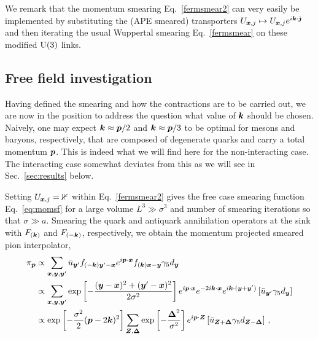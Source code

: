 We remark that the momentum smearing Eq.~\eqref{fermsmear2} can very
easily be implemented by substituting the (APE smeared) transporters
$U_{\boldsymbol{x},j}\mapsto U_{\boldsymbol{x},j}e^{i\boldsymbol{k}\cdot\hat{\boldsymbol{\jmath}}}$
and then iterating the usual Wuppertal smearing
Eq.~\eqref{fermsmear} on these modified
$\textmd{U}(3)$ links.

\subsection{Free field investigation}
\label{freefield}
Having defined the smearing and how the contractions are to be
carried out, we are now in the position to address the question
what value of $\boldsymbol{k}$
should be chosen. Naively, one may expect $\boldsymbol{k}\approx \boldsymbol{p}/2$
and $\boldsymbol{k}\approx\boldsymbol{p}/3$ to be optimal for mesons and baryons,
respectively, that are composed of degenerate quarks and carry
a total momentum
$\boldsymbol{p}$. This is indeed what we will find here for
the non-interacting case.
The interacting case somewhat deviates from this as we will
see in Sec.~\ref{sec:results} below.

Setting $U_{\boldsymbol{x},j}=\mathbb{1}$ within Eq.~\eqref{fermsmear2}
gives the free case smearing function Eq.~\eqref{eq:momsf}
for a large volume $L^3\gg\sigma^3$ and number of smearing iterations
so that $\sigma\gg a$.
Smearing the quark and antiquark annihilation operators
at the sink with $F_{(\boldsymbol{k})}$
and $F_{(-\boldsymbol{k})}$, respectively, we obtain
the momentum projected smeared pion interpolator,
\begin{align}
\pi_{\boldsymbol{p}}&\propto
\sum_{\boldsymbol{x}, \boldsymbol{y},\boldsymbol{y}^{\prime}}
\bar{u}_{\boldsymbol{y}'}f_{(-\boldsymbol{k})\boldsymbol{y}'-\boldsymbol{x}} e^{i\boldsymbol{p}\cdot\boldsymbol{x}}
f_{(\boldsymbol{k})\boldsymbol{x}-\boldsymbol{y}}\gamma_5d_{\boldsymbol{y}}\nonumber\\
&\propto\sum_{\boldsymbol{x}, \boldsymbol{y},\boldsymbol{y}^{\prime}}\exp\left[-\frac{(\boldsymbol{y}-\boldsymbol{x})^2+(\boldsymbol{y}'-\boldsymbol{x})^2}{2\sigma^2}\right]
 e^{i\boldsymbol{p}\cdot\boldsymbol{x}}e^{-2i\boldsymbol{k}\cdot\boldsymbol{x}} e^{i\boldsymbol{k}\cdot(\boldsymbol{y}+\boldsymbol{y}^{\prime})} \left[\bar{u}_{\boldsymbol{y}^{\prime}} \gamma_5 d_{\boldsymbol{y}}\right]\label{eq:freec}\\\nonumber
&\propto \exp\left[-\frac{\sigma^2}{2}(\boldsymbol{p}-2 \boldsymbol{k})^2\right]
\sum_{\boldsymbol{Z},\boldsymbol{\Delta}}
\exp\left[-\frac{\boldsymbol{\Delta}^2}{\sigma^2}\right]
e^{i\boldsymbol{p}\cdot \boldsymbol{Z}} \left[\bar{u}_{\boldsymbol{Z}+\boldsymbol{\Delta}} \gamma_5 d_{\boldsymbol{Z}-\boldsymbol{\Delta}}\right]\,,
\end{align}

